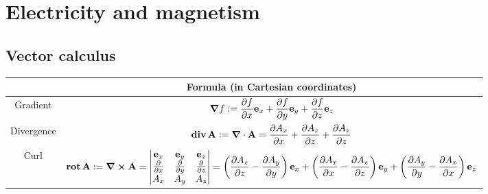 \documentclass[../../../main.tex]{subfiles}
\begin{document}
\section{Electricity and magnetism}
\subsection{Vector calculus}
\begin{center}
  \begin{tabular}{|c|c|}

    \hline
               & Formula (in Cartesian coordinates)                                                                                                                                                                                                                                                                                                                                                                     \\
    \hline
    Gradient   & $\displaystyle\grad f:=\frac{\partial f}{\partial x}\boldsymbol{\mathrm{e}}_x+\frac{\partial f}{\partial y}\boldsymbol{\mathrm{e}}_y+\frac{\partial f}{\partial z}\boldsymbol{\mathrm{e}}_z$                                                                                                                                                                                                                          \\
    \hline
    Divergence & $\displaystyle\operatorname{\boldsymbol{\mathrm{div}}} \boldsymbol{\mathrm{A}}:=\grad\cdot\boldsymbol{\mathrm{A}}=\frac{\partial A_x}{\partial x}+\frac{\partial A_z}{\partial z}+\frac{\partial A_z}{\partial z}$                                                                                                                                                                                                                                   \\
    \hline
    Curl       & $\displaystyle\rot \vectorfunction{A}:=\grad\crossprod\vectorfunction{A}=\begin{vmatrix}
        \vectorfunction{e}_x        & \vectorfunction{e}_y        & \vectorfunction{e}_z        \\
        \frac{\partial}{\partial x} & \frac{\partial}{\partial y} & \frac{\partial}{\partial z} \\
        A_x                         & A_y                         & A_z                         \\
      \end{vmatrix}=\left(\frac{\partial A_z}{\partial z}-\frac{\partial A_y}{\partial y}\right)\vectorfunction{e}_x+\left(\frac{\partial A_x}{\partial x}-\frac{\partial A_z}{\partial z}\right)\vectorfunction{e}_y+\left(\frac{\partial A_y}{\partial y}-\frac{\partial A_x}{\partial x}\right)\vectorfunction{e}_z$ \\

\end{tabular}
\end{center}
\end{document}
